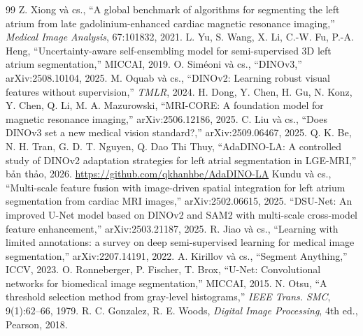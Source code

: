 \documentclass[11pt,a4paper]{article}
\begin{document}
\begingroup\small
\begin{thebibliography}{99}\setlength{\itemsep}{1pt}
 Z. Xiong và cs., ``A global benchmark of algorithms for segmenting the left atrium from late gadolinium-enhanced cardiac magnetic resonance imaging,'' \emph{Medical Image Analysis}, 67:101832, 2021.
 L. Yu, S. Wang, X. Li, C.-W. Fu, P.-A. Heng, ``Uncertainty-aware self-ensembling model for semi-supervised 3D left atrium segmentation,'' MICCAI, 2019.
 O. Siméoni và cs., ``DINOv3,'' arXiv:2508.10104, 2025.
 M. Oquab và cs., ``DINOv2: Learning robust visual features without supervision,'' \emph{TMLR}, 2024.
 H. Dong, Y. Chen, H. Gu, N. Konz, Y. Chen, Q. Li, M. A. Mazurowski, ``MRI-CORE: A foundation model for magnetic resonance imaging,'' arXiv:2506.12186, 2025.
 C. Liu và cs., ``Does DINOv3 set a new medical vision standard?,'' arXiv:2509.06467, 2025.
 Q. K. Be, N. H. Tran, G. D. T. Nguyen, Q. Dao Thi Thuy, ``AdaDINO-LA: A controlled study of DINOv2 adaptation strategies for left atrial segmentation in LGE-MRI,'' bản thảo, 2026. \url{https://github.com/qkhanhbe/AdaDINO-LA}
 Kundu và cs., ``Multi-scale feature fusion with image-driven spatial integration for left atrium segmentation from cardiac MRI images,'' arXiv:2502.06615, 2025.
 ``DSU-Net: An improved U-Net model based on DINOv2 and SAM2 with multi-scale cross-model feature enhancement,'' arXiv:2503.21187, 2025.
 R. Jiao và cs., ``Learning with limited annotations: a survey on deep semi-supervised learning for medical image segmentation,'' arXiv:2207.14191, 2022.
 A. Kirillov và cs., ``Segment Anything,'' ICCV, 2023.
 O. Ronneberger, P. Fischer, T. Brox, ``U-Net: Convolutional networks for biomedical image segmentation,'' MICCAI, 2015.
 N. Otsu, ``A threshold selection method from gray-level histograms,'' \emph{IEEE Trans. SMC}, 9(1):62--66, 1979.
 R. C. Gonzalez, R. E. Woods, \emph{Digital Image Processing}, 4th ed., Pearson, 2018.
\end{thebibliography}
\endgroup
\end{document}
